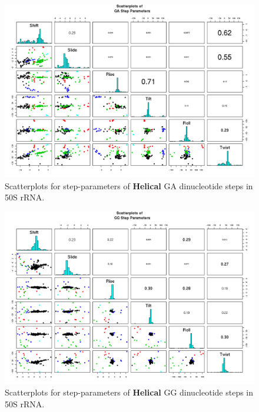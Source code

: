 \begin{figure}[H]
\centering
\includegraphics[angle=90, scale=0.6]{Helical/GA.png}
\caption{Scatterplots for step-parameters of \textbf{Helical} GA dinucleotide steps
in 50S rRNA.}
\label{fig:stepsGA}
\end{figure}

\begin{figure}[H]
\centering
\includegraphics[angle=90, scale=0.6]{Helical/GG.png}
\caption{Scatterplots for step-parameters of \textbf{Helical} GG dinucleotide steps
in 50S rRNA.}
\label{fig:stepsGG}
\end{figure}


